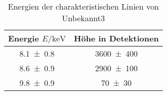
\begin{table}[H]
    \centering
    \caption{Energien der charakteristischen Linien von Unbekannt3}
    \label{tab:label}
    \begin{tabular}{c|c}
       Energie $E/\unit{\kilo\electronvolt}$ & Höhe in Detektionen \\
\hline
\num{8.1\pm 0.8} & \num{3600\pm 400} \\ 
\num{8.6\pm 0.9} & \num{2900\pm 100} \\ 
\num{9.8\pm 0.9} & \num{70\pm 30} \\ 

    \end{tabular}
\end{table}
